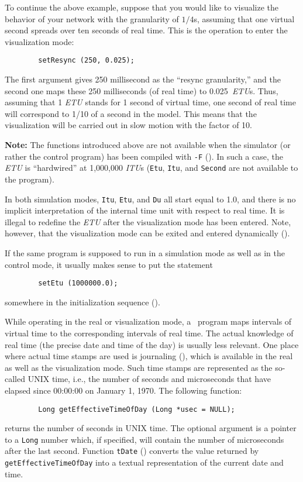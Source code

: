 To continue the above example, suppose that you would like to visualize
the behavior of your network with the granularity of $1/4$s, assuming that
one virtual second spreads over ten seconds of real time.
This is the operation to enter the visualization mode:
\begin{verbatim}
        setResync (250, 0.025);
\end{verbatim}
\noindent
The first argument gives 250 millisecond as the ``resync granularity,''
and the second one maps these 250 milliseconds (of real time) to
0.025~{\em ETU\/}s.
Thus, assuming that 1 {\em ETU\/} stands for
1 second of virtual time, one second of
real time will correspond to 1/10 of a second in the model.
This means that the
visualization will be carried out in slow motion with the
factor of 10.

\medskip

\noindent
{\bf Note:} The functions introduced above are not available when
the simulator (or rather the control program) has been compiled with
{\tt -F} ().
In such a case, the {\em ETU\/} is ``hardwired'' at 1,000,000
{\em ITU\/}s ({\tt Etu}, {\tt Itu}, and {\tt Second} are not available
to the program).

\medskip

In both simulation modes,
{\tt Itu}, {\tt Etu}, and {\tt Du} all start equal to 1.0,
and there is no implicit interpretation of the internal time unit with
respect to real time.
It is illegal to redefine the {\em ETU\/} after the visualization mode
has been entered.
Note, however, that the visualization mode can be exited and entered
dynamically ().

If the same program is supposed to run in a simulation mode as well as in
the control mode, it usually makes sense to put the statement
\begin{verbatim}
        setEtu (1000000.0);
\end{verbatim}
\noindent
somewhere in the initialization sequence ().

While operating in the real or visualization mode,
a \smurph\ program maps intervals of
virtual time to the corresponding intervals of real time.
The actual knowledge of real time (the precise date and time of the day) is
usually less relevant.
One place where actual time stamps are used is journaling
(), which is available in the real as well as the
visualization mode.
Such time stamps are represented as the so-called UNIX time, i.e.,
the number of seconds and microseconds that have elapsed
since 00:00:00 on January 1, 1970.
The following function:
\begin{verbatim}
        Long getEffectiveTimeOfDay (Long *usec = NULL);
\end{verbatim}
returns the number of seconds in UNIX time.
The optional argument is a pointer to a {\tt Long} number which,
if specified, will contain the number of microseconds after the
last second.
Function {\tt tDate} ()
converts the value returned by {\tt getEffectiveTimeOfDay} into a textual
representation of the current date and time.

